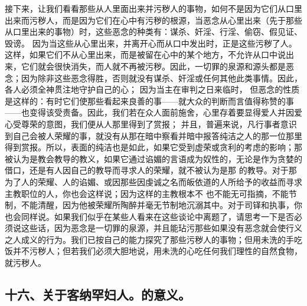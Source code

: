 接下来，让我们看看那些从人里面出来并污秽人的事物，如何不是因为它们从口里出来而污秽人，而是因为它们在心中有污秽的根源，当恶念从心里出来（先于那些从口里出来的事物）时，这些恶念的种类有：谋杀、奸淫、行淫、偷窃、假见证、毁谤。 因为当这些从心里出来，并离开心而从口中发出时，正是这些污秽了人。这样，如果它们不从心里出来，而是被留在心中的某个地方，不允许从口中说出来，它们就会很快消失，而人就不再被污秽。因此，一切罪的泉源和源头都是恶念；因为除非这些恶念得胜，否则就没有谋杀、奸淫或任何其他此类事情。因此，各人必须全神贯注地守护自己的心； 因为当主在审判之日来临时，      但恶念的性质是这样的：有时它们使那些看起来良善的事——就大众的判断而言值得称赞的事——也变得该受责备。因此，我们若在众人面前施舍，心里存着要显得爱人并因爱心受尊荣的意图，我们便从人那里得到了赏报； 并且，普遍来说，凡行事者意识到自己会被人荣耀的事，就没有从那在暗中察看并暗中报答纯洁之人的那一位那里得到赏报。所以，表面的纯洁也是如此，如果它受到虚荣或贪利的考虑的影响；那被认为是教会教导的教义，如果它通过谄媚的言语成为奴性的，无论是作为贪婪的借口，还是有人因自己的教导而寻求人的荣耀，就不被认为是那  的教导。对于那为了人的荣耀、人的谄媚、或因那些因虔诚之名而皈依道的人所给予的收益而寻求主教职位的人，你也会这样说；因为这样的主教根本不  也不能无可指摘，不能节制，不能清醒，因为他被荣耀所陶醉并毫无节制地沉溺其中。对于司铎和执事，你也会同样说。如果我们似乎在某些人看来在这些谈论中离题了，请思考一下是否必须说这些话，因为恶念是一切罪的泉源，并且能玷污那些如果没有恶念就会使行义之人成义的行为。我们已按自己的能力探究了那些污秽人的事物；但用未洗的手吃饭并不污秽人；但若我们必须大胆地说，用未洗的心吃任何我们理性的自然食物，就污秽人。\par


\subsection{十六、关于客纳罕妇人。的意义。}


